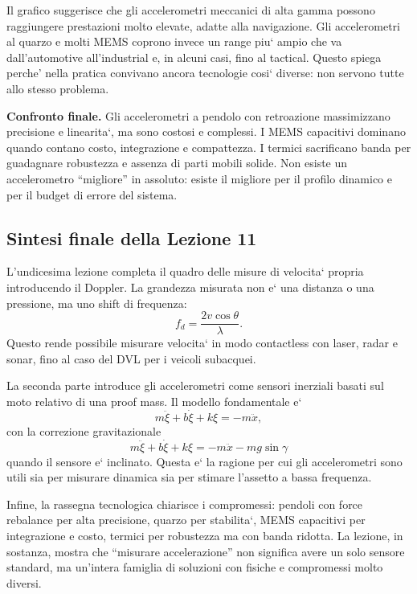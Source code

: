 \documentclass[11pt,a4paper]{article}
\begin{document}
Il grafico suggerisce che gli accelerometri meccanici di alta gamma possono raggiungere prestazioni molto elevate, adatte alla navigazione. Gli accelerometri al quarzo e molti MEMS coprono invece un range piu` ampio che va dall'automotive all'industrial e, in alcuni casi, fino al tactical. Questo spiega perche' nella pratica convivano ancora tecnologie cosi` diverse: non servono tutte allo stesso problema.

\begin{keybox}
\textbf{Confronto finale.} Gli accelerometri a pendolo con retroazione massimizzano precisione e linearita`, ma sono costosi e complessi. I MEMS capacitivi dominano quando contano costo, integrazione e compattezza. I termici sacrificano banda per guadagnare robustezza e assenza di parti mobili solide. Non esiste un accelerometro ``migliore'' in assoluto: esiste il migliore per il profilo dinamico e per il budget di errore del sistema.
\end{keybox}

\subsection*{Sintesi finale della Lezione 11}

L'undicesima lezione completa il quadro delle misure di velocita` propria introducendo il Doppler. La grandezza misurata non e` una distanza o una pressione, ma uno shift di frequenza:
\[
f_d=\frac{2v\cos\theta}{\lambda}.
\]
Questo rende possibile misurare velocita` in modo contactless con laser, radar e sonar, fino al caso del DVL per i veicoli subacquei.

La seconda parte introduce gli accelerometri come sensori inerziali basati sul moto relativo di una proof mass. Il modello fondamentale e`
\[
m\ddot\xi+b\dot\xi+k\xi=-m\ddot x,
\]
con la correzione gravitazionale
\[
m\ddot\xi+b\dot\xi+k\xi=-m\ddot x-mg\sin\gamma
\]
quando il sensore e` inclinato. Questa e` la ragione per cui gli accelerometri sono utili sia per misurare dinamica sia per stimare l'assetto a bassa frequenza.

Infine, la rassegna tecnologica chiarisce i compromessi: pendoli con force rebalance per alta precisione, quarzo per stabilita`, MEMS capacitivi per integrazione e costo, termici per robustezza ma con banda ridotta. La lezione, in sostanza, mostra che ``misurare accelerazione'' non significa avere un solo sensore standard, ma un'intera famiglia di soluzioni con fisiche e compromessi molto diversi.

\end{document}
